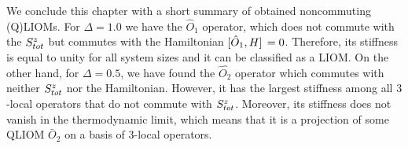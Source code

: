 We conclude this chapter with a short summary of obtained noncommuting (Q)LIOMs.
For \(\Delta = 1.0\) we have the \(\hat{O}_1\) operator, which does not commute with the \(S^{z}_{tot}\)
but commutes with the Hamiltonian \(\comm*{\hat{O}_1}{H} = 0\). Therefore, its stiffness is equal to unity
for all system sizes and it can be classified as a LIOM.
On the other hand, for \(\Delta = 0.5\), we have found the \(\hat{O_2}\) operator which commutes with
neither \(S^{z}_{tot}\) nor the Hamiltonian. However, it has the largest stiffness among all \(3\)-local
operators that do not commute with \(S^{z}_{tot}\). Moreover, its stiffness does not vanish in the thermodynamic
limit, which means that it is a projection of some QLIOM \(\bar{O}_2\) on a basis of \(3\)-local operators.